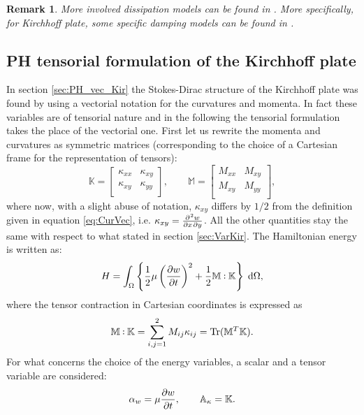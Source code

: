 \documentclass[preprint,12pt]{elsarticle}
\DeclareMathOperator{\Tr}{Tr}
\newtheorem{remark}{Remark}
\newcommand{\revOne}[1]{\textcolor{blue!80!black}{#1}}
\def\onedot{$\mathsurround0pt\ldotp$}
\def\cddot{%
	\mathbin{\vcenter{\baselineskip.67ex
			\hbox{\onedot}\hbox{\onedot}}%
}}
\begin{document}
\begin{remark}
More involved dissipation models can be found in \cite{DissDenis}. More specifically, for Kirchhoff plate, some specific damping models can be found in \cite{LambourgJASA}.
\end{remark}	


\subsection{PH tensorial formulation of the Kirchhoff plate}
\label{sec:PH_ten_Kir}

In section \ref{sec:PH_vec_Kir} the Stokes-Dirac structure of the Kirchhoff plate was found by using a vectorial notation for the curvatures and momenta. \revOne{In fact} these variables are of tensorial nature and in the following the tensorial formulation takes the place of the vectorial one. First let us rewrite the momenta and curvatures as symmetric matrices (corresponding to the choice of a Cartesian frame for the representation of tensors):
\begin{equation}
\mathbb{K} = 
\begin{bmatrix}
\kappa_{xx} &  \kappa_{xy}\\
\kappa_{xy} & \kappa_{yy} \\
\end{bmatrix}, \qquad
\mathbb{M} =
\begin{bmatrix}
M_{xx} & M_{xy} \\
M_{xy} & M_{yy} \\
\end{bmatrix},
\end{equation}
where now, with a slight abuse of notation, $\kappa_{xy}$ \revOne{differs by $1/2$ from the definition given in equation \eqref{eq:CurVec}}, i.e. $\kappa_{xy} =\diffp{w}{x,y}$. All the other quantities stay the same with respect to what stated in section \ref{sec:VarKir}. The Hamiltonian energy is written as:
\begin{equation}
\label{eq:H_Kir_Ten}
H = \int_{\Omega} \left\{ \frac{1}{2} \mu \left(\diffp{w}{t} \right)^2 + \frac{1}{2} \mathbb{M} \cddot \mathbb{K}  \right\}  \d{\Omega} ,
\end{equation}
where the tensor contraction in Cartesian coordinates is expressed as
\[\mathbb{M} \cddot \mathbb{K} = \sum_{i,j = 1}^{2} M_{ij} \kappa_{ij} = \Tr(\mathbb{M}^T \mathbb{K}). \]
For what concerns the choice of the energy variables, a scalar and a tensor variable are considered:
\begin{equation}
\alpha_w = \mu \diffp{w}{t}, \qquad \mathbb{A}_{\kappa} = \mathbb{K}.	\end{equation}
\end{document}
